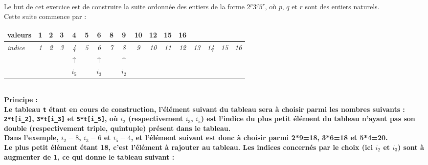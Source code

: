 Le but de cet exercice est de construire la suite ordonnée des entiers
de la forme $2^p3^q5^r$, où $p$, $q$ et $r$ sont des entiers naturels.\\
Cette suite commence par :\\


\begin{tabular}{|l|c|c|c|c|c|c|c|c|c|c|c|c|c|c|c|c|}
 \hline
 valeurs&\bf 1&\bf 2&\bf 3&\bf 4&\bf 5&\bf 6&\bf 8&\bf 9&\bf 10&\bf
12&\bf 15&\bf 16&&&&\\ \hline
 \it indice&\it 1&\it 2&\it 3&\it 4&\it 5&\it 6&\it
7&\it 8&\it 9&\it 10&\it 11&\it 12&\it 13&\it 14&\it 15&\it 16\rm\\ 
 \hline
\multicolumn{1}{c}{} &\multicolumn{1}{c}{}
&\multicolumn{1}{c}{} &\multicolumn{1}{c}{}
&\multicolumn{1}{c}{$\uparrow$}&\multicolumn{1}{c}{}
&\multicolumn{1}{c}{$\uparrow$}&\multicolumn{1}{c}{}
&\multicolumn{1}{c}{$\uparrow$} &\multicolumn{1}{c}{}&\multicolumn{1}{c}{}
&\multicolumn{1}{c}{}
&\multicolumn{1}{c}{} &\multicolumn{1}{c}{} &\multicolumn{1}{c}{}
&\multicolumn{1}{c}{} &\multicolumn{1}{c}{} \\
 \multicolumn{1}{c}{} &\multicolumn{1}{c}{} &\multicolumn{1}{c}{}
&\multicolumn{1}{c}{} &\multicolumn{1}{c}{$i_5$}&\multicolumn{1}{c}{}
&\multicolumn{1}{c}{$i_3$}&\multicolumn{1}{c}{}
&\multicolumn{1}{c}{$i_2$}&\multicolumn{1}{c}{} &\multicolumn{1}{c}{}
&\multicolumn{1}{c}{}
&\multicolumn{1}{c}{} &\multicolumn{1}{c}{} &\multicolumn{1}{c}{}
&\multicolumn{1}{c}{} &\multicolumn{1}{c}{} 
 \end{tabular}
\\

\noindent\bf Principe :\rm\\

Le tableau \texttt{t} étant en cours de construction, l'élément suivant du
tableau sera à choisir parmi les nombres suivants : \texttt{2*t[i\_2]},
\texttt{3*t[i\_3]} et \texttt{5*t[i\_5]}, où $i_2$ (respectivement $i_3$,
$i_5$) est l'indice du plus petit élément du tableau n'ayant pas son double
(respectivement triple, quintuple) présent dans le tableau.\\
Dans l'exemple, $i_2=8$, $i_3=6$ et $i_5=4$, et l'élément suivant est donc à
choisir parmi 2*9=18, 3*6=18 et 5*4=20.\\
Le plus petit élément étant 18, c'est l'élément à rajouter au tableau. Les
indices concernés par le choix (ici $i_2$ et $i_3$) sont à augmenter de 1, ce
qui donne le tableau suivant :\\

